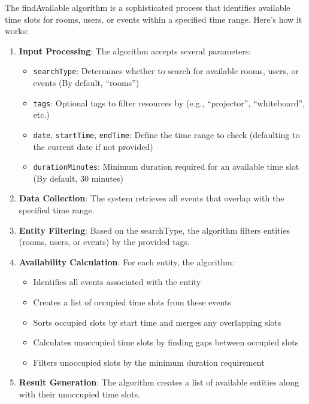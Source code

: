 The findAvailable algorithm is a sophisticated process that identifies available time slots for rooms, users, or events within a specified time range.
Here's how it works:

\begin{enumerate}
    \item \textbf{Input Processing}: The algorithm accepts several parameters:
    \begin{itemize}
        \item \texttt{searchType}: Determines whether to search for available rooms, users, or events (By default, ``rooms'')
        \item \texttt{tags}: Optional tags to filter resources by (e.g., ``projector'', ``whiteboard'', etc.)
        \item \texttt{date}, \texttt{startTime}, \texttt{endTime}: Define the time range to check (defaulting to the current date if not provided)
        \item \texttt{durationMinutes}: Minimum duration required for an available time slot (By default, 30 minutes)
    \end{itemize}

    \item \textbf{Data Collection}: The system retrieves all events that overlap with the specified time range.

    \item \textbf{Entity Filtering}: Based on the searchType, the algorithm filters entities (rooms, users, or events) by the provided tags.

    \item \textbf{Availability Calculation}: For each entity, the algorithm:
    \begin{itemize}
        \item Identifies all events associated with the entity
        \item Creates a list of occupied time slots from these events
        \item Sorts occupied slots by start time and merges any overlapping slots
        \item Calculates unoccupied time slots by finding gaps between occupied slots
        \item Filters unoccupied slots by the minimum duration requirement
    \end{itemize}

    \item \textbf{Result Generation}: The algorithm creates a list of available entities along with their unoccupied time slots.
\end{enumerate}

